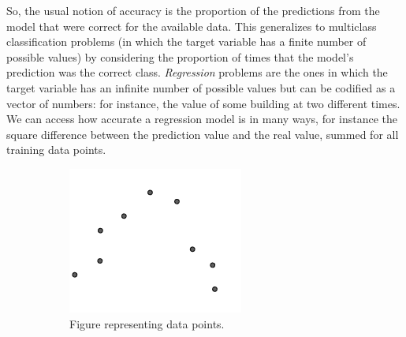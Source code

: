 So, the usual notion of accuracy is the proportion of the predictions from the model that were correct for the available data. This generalizes to multiclass classification problems (in which the target variable has a finite number of possible values) by considering the proportion of times that the model's prediction was the correct class. \emph{Regression} problems are the ones in which the target variable has an infinite number of possible values but can be codified as a vector of numbers: for instance, the value of some building at two different times. We can access how accurate a regression model is in many ways, for instance the square difference between the prediction value and the real value, summed for all training data points.

\begin{figure}[ht]
\centering
\begin{subfigure}[b]{0.24\textwidth}
\centering
\includegraphics[width=\textwidth]{polymOverfitEmpty}
\caption{Figure representing data points.}\label{fig:polymOverfitEmpty}
\end{subfigure}
\hfill
\begin{subfigure}[b]{0.24\textwidth}
\centering

\end{subfigure}
\end{figure}
